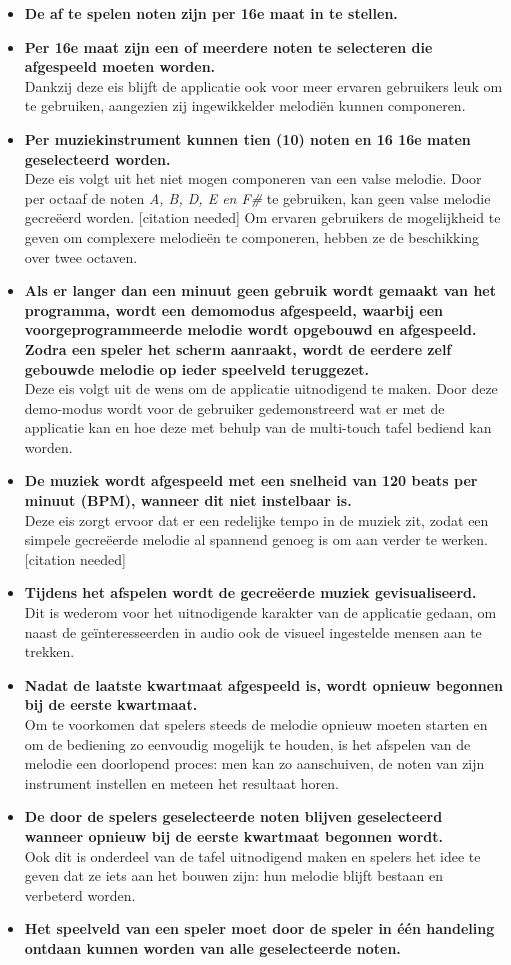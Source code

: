 \documentclass{acm}
\begin{document}
\begin{itemize}
	\item \textbf{De af te spelen noten zijn per 16e maat in te stellen.}
	\item \textbf{Per 16e maat zijn een of meerdere noten te selecteren die afgespeeld moeten worden.} \\ Dankzij deze eis blijft de applicatie ook voor meer ervaren gebruikers leuk om te gebruiken, aangezien zij ingewikkelder melodi\"en kunnen componeren.
	\item \textbf{Per muziekinstrument kunnen tien (10) noten en 16 16e maten geselecteerd worden.} \\ Deze eis volgt uit het niet mogen componeren van een valse melodie. Door per octaaf de noten \textit{A, B, D, E en F\#} te gebruiken, kan geen valse melodie gecreëerd worden. [citation needed] Om ervaren gebruikers de mogelijkheid te geven om complexere melodie\"en te componeren, hebben ze de beschikking over twee octaven.
	\item \textbf{Als er langer dan een minuut geen gebruik wordt gemaakt van het programma, wordt een demomodus afgespeeld, waarbij een voorgeprogrammeerde melodie wordt opgebouwd en afgespeeld. Zodra een speler het scherm aanraakt, wordt de eerdere zelf gebouwde melodie op ieder speelveld teruggezet.} \\ Deze eis volgt uit de wens om de applicatie uitnodigend te maken. Door deze demo-modus wordt voor de gebruiker gedemonstreerd wat er met de applicatie kan en hoe deze met behulp van de multi-touch tafel bediend kan worden.
	\item \textbf{De muziek wordt afgespeeld met een snelheid van 120 beats per minuut (BPM), wanneer dit niet instelbaar is.} \\ Deze eis zorgt ervoor dat er een redelijke tempo in de muziek zit, zodat een simpele gecre\"eerde melodie al spannend genoeg is om aan verder te werken. [citation needed]
	\item \textbf{Tijdens het afspelen wordt de gecreëerde muziek gevisualiseerd.} \\ Dit is wederom voor het uitnodigende karakter van de applicatie gedaan, om naast de ge\"interesseerden in audio ook de visueel ingestelde mensen aan te trekken.
	\item \textbf{Nadat de laatste kwartmaat afgespeeld is, wordt opnieuw begonnen bij de eerste kwartmaat.} \\ Om te voorkomen dat spelers steeds de melodie opnieuw moeten starten en om de bediening zo eenvoudig mogelijk te houden, is het afspelen van de melodie een doorlopend proces: men kan zo aanschuiven, de noten van zijn instrument instellen en meteen het resultaat horen.
	\item \textbf{De door de spelers geselecteerde noten blijven geselecteerd wanneer opnieuw bij de eerste kwartmaat begonnen wordt.} \\ Ook dit is onderdeel van de tafel uitnodigend maken en spelers het idee te geven dat ze iets aan het bouwen zijn: hun melodie blijft bestaan en verbeterd worden.
	\item \textbf{Het speelveld van een speler moet door de speler in \'e\'en handeling ontdaan kunnen worden van alle geselecteerde noten.}
\end{itemize}
\end{document}
